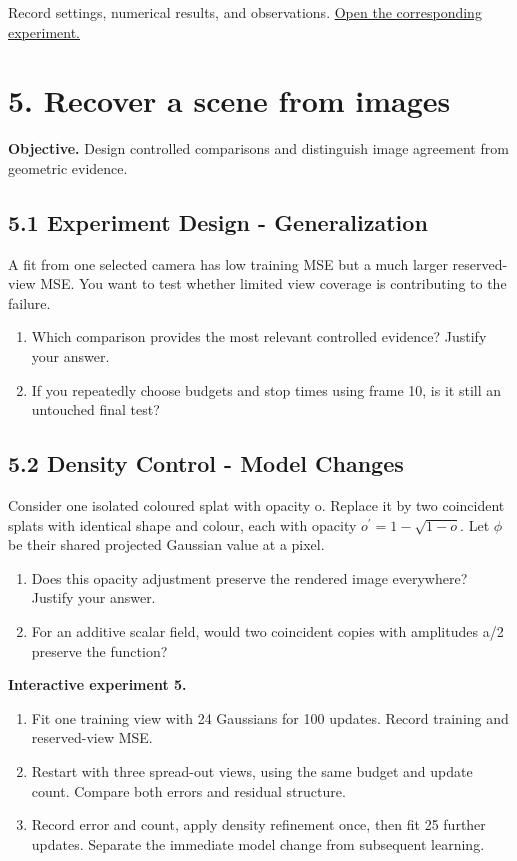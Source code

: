 \documentclass[11pt,a4paper]{article}
\begin{document}
Record settings, numerical results, and observations.
\href{https://sosekie.github.io/Unibe-CVG-CV-Interactive-Labs/tutorial-09/#colour}{Open the corresponding experiment.}\par
{}\section*{5. Recover a scene from images}
\noindent\textbf{Objective.} Design controlled comparisons and distinguish image agreement from geometric evidence.
\subsection*{5.1 Experiment Design - Generalization}
A fit from one selected camera has low training MSE but a much larger reserved-view MSE.
You want to test whether limited view coverage is contributing to the failure.
\begin{enumerate}[label=(\alph*),nosep]
\item Which comparison provides the most relevant controlled evidence?
Justify your answer.
\item If you repeatedly choose budgets and stop times using frame 10, is it still an untouched final test?
\end{enumerate}
\subsection*{5.2 Density Control - Model Changes}
Consider one isolated coloured splat with opacity o.
Replace it by two coincident splats with identical shape and colour, each with opacity $o^\prime=1-\sqrt{1-o}$.
Let $\phi$ be their shared projected Gaussian value at a pixel.
\begin{enumerate}[label=(\alph*),nosep]
\item Does this opacity adjustment preserve the rendered image everywhere?
Justify your answer.
\item For an additive scalar field, would two coincident copies with amplitudes a/2 preserve the function?
\end{enumerate}
\noindent\textbf{Interactive experiment 5.}\begin{enumerate}[nosep]
\item Fit one training view with 24 Gaussians for 100 updates.
Record training and reserved-view MSE.
\item Restart with three spread-out views, using the same budget and update count.
Compare both errors and residual structure.
\item Record error and count, apply density refinement once, then fit 25 further updates.
Separate the immediate model change from subsequent learning.
\end{enumerate}
\end{document}
